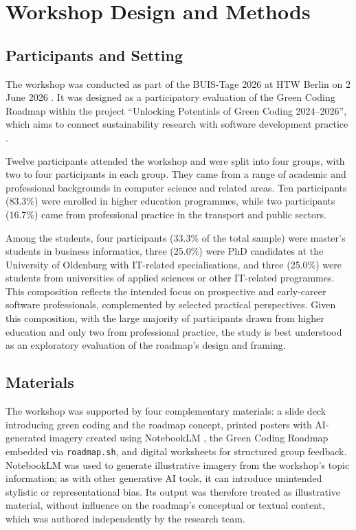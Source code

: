 \documentclass[english]{lni}
\begin{document}
\section{Workshop Design and Methods}

\subsection{Participants and Setting}
The workshop was conducted as part of the BUIS-Tage 2026 at HTW Berlin on 2 June 2026 \cite{buis_tage_2026}. It was designed as a participatory evaluation of the Green Coding Roadmap within the project \enquote{Unlocking Potentials of Green Coding 2024--2026}, which aims to connect sustainability research with software development practice \cite{junger_2026_workshop}.

Twelve participants attended the workshop and were split into four groups, with two to four participants in each group. They came from a range of academic and professional backgrounds in computer science and related areas. Ten participants (83.3\%) were enrolled in higher education programmes, while two participants (16.7\%) came from professional practice in the transport and public sectors.

Among the students, four participants (33.3\% of the total sample) were master's students in business informatics, three (25.0\%) were PhD candidates at the University of Oldenburg with IT-related specialisations, and three (25.0\%) were students from universities of applied sciences or other IT-related programmes. This composition reflects the intended focus on prospective and early-career software professionals, complemented by selected practical perspectives. Given this composition, with the large majority of participants drawn from higher education and only two from professional practice, the study is best understood as an exploratory evaluation of the roadmap's design and framing.

\subsection{Materials}

The workshop was supported by four complementary materials: a slide deck introducing green coding and the roadmap concept, printed posters with AI-generated imagery created using NotebookLM \cite{GNotebookLM}, the Green Coding Roadmap embedded via \texttt{roadmap.sh}, and digital worksheets for structured group feedback.  
NotebookLM was used to generate illustrative imagery from the workshop's topic information; as with other generative AI tools, it can introduce unintended stylistic or representational bias. Its output was therefore treated as illustrative material, without influence on the roadmap's conceptual or textual content, which was authored independently by the research team.
\end{document}
